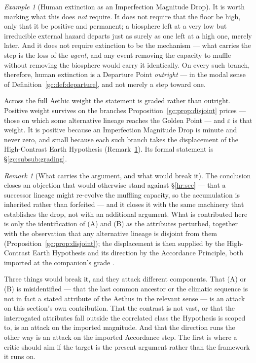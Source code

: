 \documentclass[11pt]{article}
\numberwithin{equation}{section}
\theoremstyle{plain}
\theoremstyle{definition}
\theoremstyle{remark}
\newtheorem{remark}[theorem]{Remark}
\newtheorem{example}[theorem]{Example}
\begin{document}
\begin{example}[Human extinction as an Imperfection Magnitude Drop]
It is worth marking what this does \emph{not} require. It does not
require that the floor be high, only that it be positive and permanent;
a biosphere left at a very low but irreducible external hazard departs
just as surely as one left at a high one, merely later. And it does not
require extinction to be the mechanism --- what carries the step is the
loss of the \emph{agent}, and any event removing the capacity to muffle
without removing the biosphere would carry it identically.
On every such branch, therefore, human extinction is a Departure Point
\emph{outright} --- in the modal sense of
Definition~\ref{gc:def:departure}, and not merely a step toward one.

Across the full Aethic weight the statement is graded rather than
outright. Positive weight survives on the branches
Proposition~\ref{gc:prop:disjoint} prices --- those on which some
alternative lineage reaches the Golden Point --- and $\varepsilon$ is
that weight. It is positive because an Imperfection Magnitude Drop is
minute and never zero, and small because each such branch takes the
displacement of the High-Contrast Earth Hypothesis
(Remark~\ref{gc:rem:whatcarries}). Its formal statement is
\S\ref{gc:subsub:grading}.

\begin{remark}[What carries the argument, and what would break it]
\label{gc:rem:whatcarries}
The conclusion closes an objection that would otherwise stand against
\S\ref{hr:sec} --- that a successor lineage might re-evolve the muffling
capacity, so the accumulation is inherited rather than forfeited --- and
it closes it with the same machinery that establishes the drop, not
with an additional argument. What is contributed here is only the
identification of (A) and (B) as the attributes perturbed, together
with the observation that any alternative lineage is disjoint from them
(Proposition~\ref{gc:prop:disjoint}); the displacement is then supplied
by the High-Contrast Earth Hypothesis and its direction by the
Accordance Principle, both imported at the companion's grade
\cite{Nexus, Ben26Optimal}.

Three things would break it, and they attack different components.
That (A) or (B) is misidentified --- that the last common ancestor or
the climatic sequence is not in fact a stated attribute of the Aethus in
the relevant sense --- is an attack on this section's own contribution.
That the contrast is not vast, or that the interrogated attributes fall
outside the correlated class the Hypothesis is scoped to, is an attack
on the imported magnitude. And that the direction runs the other way is
an attack on the imported Accordance step. The first is where a critic
should aim if the target is the present argument rather than the
framework it runs on.
\end{remark}
\end{example}
\end{document}

